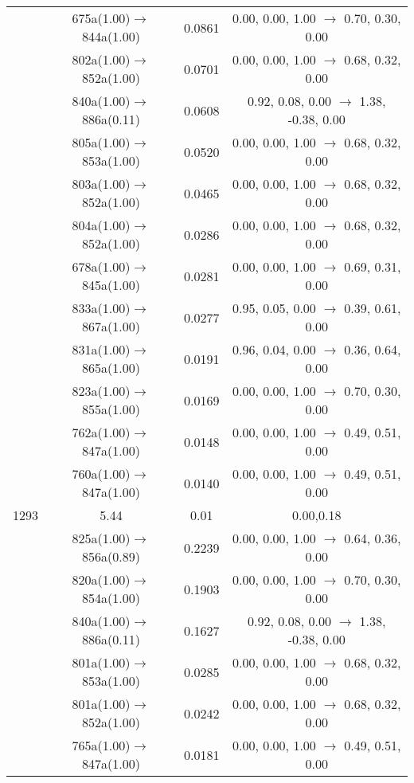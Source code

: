 \documentclass[10pt,a4paper]{article}
\begin{document}
\begin{longtable}{c|c|c|c}
 	& 675a(1.00)$\rightarrow$844a(1.00) &	 0.0861 &	 0.00, 0.00, 1.00 $\rightarrow$ 0.70, 0.30, 0.00 \\ 
 	& 802a(1.00)$\rightarrow$852a(1.00) &	 0.0701 &	 0.00, 0.00, 1.00 $\rightarrow$ 0.68, 0.32, 0.00 \\ 
 	& 840a(1.00)$\rightarrow$886a(0.11) &	 0.0608 &	 0.92, 0.08, 0.00 $\rightarrow$ 1.38, -0.38, 0.00 \\ 
 	& 805a(1.00)$\rightarrow$853a(1.00) &	 0.0520 &	 0.00, 0.00, 1.00 $\rightarrow$ 0.68, 0.32, 0.00 \\ 
 	& 803a(1.00)$\rightarrow$852a(1.00) &	 0.0465 &	 0.00, 0.00, 1.00 $\rightarrow$ 0.68, 0.32, 0.00 \\ 
 	& 804a(1.00)$\rightarrow$852a(1.00) &	 0.0286 &	 0.00, 0.00, 1.00 $\rightarrow$ 0.68, 0.32, 0.00 \\ 
 	& 678a(1.00)$\rightarrow$845a(1.00) &	 0.0281 &	 0.00, 0.00, 1.00 $\rightarrow$ 0.69, 0.31, 0.00 \\ 
 	& 833a(1.00)$\rightarrow$867a(1.00) &	 0.0277 &	 0.95, 0.05, 0.00 $\rightarrow$ 0.39, 0.61, 0.00 \\ 
 	& 831a(1.00)$\rightarrow$865a(1.00) &	 0.0191 &	 0.96, 0.04, 0.00 $\rightarrow$ 0.36, 0.64, 0.00 \\ 
 	& 823a(1.00)$\rightarrow$855a(1.00) &	 0.0169 &	 0.00, 0.00, 1.00 $\rightarrow$ 0.70, 0.30, 0.00 \\ 
 	& 762a(1.00)$\rightarrow$847a(1.00) &	 0.0148 &	 0.00, 0.00, 1.00 $\rightarrow$ 0.49, 0.51, 0.00 \\ 
 	& 760a(1.00)$\rightarrow$847a(1.00) &	 0.0140 &	 0.00, 0.00, 1.00 $\rightarrow$ 0.49, 0.51, 0.00 \\ 
 \hline1293 &	 5.44 &	 0.01 &	 0.00,0.18 \\ 
  	& 825a(1.00)$\rightarrow$856a(0.89) &	 0.2239 &	 0.00, 0.00, 1.00 $\rightarrow$ 0.64, 0.36, 0.00 \\ 
 	& 820a(1.00)$\rightarrow$854a(1.00) &	 0.1903 &	 0.00, 0.00, 1.00 $\rightarrow$ 0.70, 0.30, 0.00 \\ 
 	& 840a(1.00)$\rightarrow$886a(0.11) &	 0.1627 &	 0.92, 0.08, 0.00 $\rightarrow$ 1.38, -0.38, 0.00 \\ 
 	& 801a(1.00)$\rightarrow$853a(1.00) &	 0.0285 &	 0.00, 0.00, 1.00 $\rightarrow$ 0.68, 0.32, 0.00 \\ 
 	& 801a(1.00)$\rightarrow$852a(1.00) &	 0.0242 &	 0.00, 0.00, 1.00 $\rightarrow$ 0.68, 0.32, 0.00 \\ 
 	& 765a(1.00)$\rightarrow$847a(1.00) &	 0.0181 &	 0.00, 0.00, 1.00 $\rightarrow$ 0.49, 0.51, 0.00 \\ 

\end{longtable}
\end{document}
